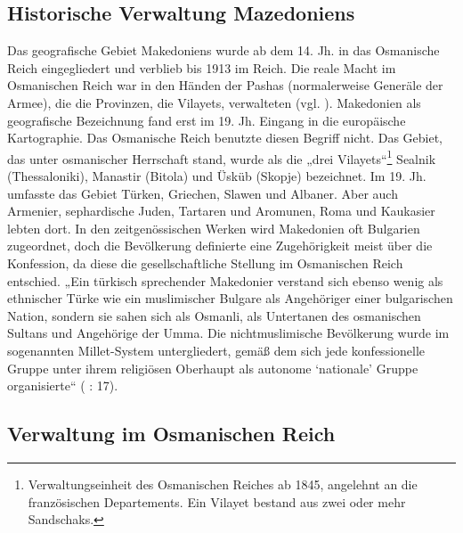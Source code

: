 \subsection{Historische Verwaltung Mazedoniens}
Das geografische Gebiet Makedoniens wurde ab dem 14. Jh. in das Osmanische Reich eingegliedert und verblieb bis 1913 im Reich. Die reale Macht im Osmanischen Reich war in den Händen der Pashas (normalerweise Generäle der Armee), die die Provinzen, die Vilayets, verwalteten (vgl. \cite{toepfer}). Makedonien als geografische Bezeichnung fand erst im 19. Jh. Eingang in die europäische Kartographie. Das Osmanische Reich benutzte diesen Begriff nicht. Das Gebiet, das unter osmanischer Herrschaft stand, wurde als die „drei Vilayets“\footnote{Verwaltungseinheit des Osmanischen Reiches ab 1845, angelehnt an die französischen Departements. Ein Vilayet bestand aus zwei oder mehr Sandschaks.} Sealnik (Thessaloniki), Manastir (Bitola) und Üsküb (Skopje) bezeichnet. Im 19. Jh. umfasste das Gebiet Türken, Griechen, Slawen und Albaner. Aber auch Armenier, sephardische Juden, Tartaren und Aromunen, Roma und Kaukasier lebten dort. In den zeitgenössischen Werken wird Makedonien oft Bulgarien zugeordnet, doch die Bevölkerung definierte eine Zugehörigkeit meist über die Konfession, da diese die gesellschaftliche Stellung im Osmanischen Reich entschied. „Ein türkisch sprechender Makedonier verstand sich ebenso wenig als ethnischer Türke wie ein muslimischer Bulgare als Angehöriger einer bulgarischen Nation, sondern sie sahen sich als Osmanli, als Untertanen des osmanischen Sultans und Angehörige der Umma. Die nichtmuslimische Bevölkerung wurde im sogenannten Millet-System untergliedert, gemäß dem sich jede konfessionelle Gruppe unter ihrem religiösen Oberhaupt als autonome ‘nationale’ Gruppe organisierte“ (\cite{opfer} : 17).

\subsection{Verwaltung im Osmanischen Reich}

